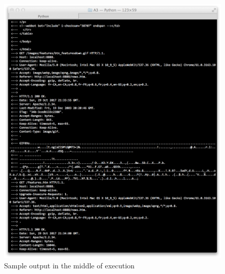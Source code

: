 \documentclass[11pt]{article}
\begin{document}
	\begin{figure}[H]
	\includegraphics[scale=0.5, trim={0cm 0cm 0cm 0cm}, clip]{strip_output_mid}
	\caption{Sample output in the middle of execution}
	\end{figure}
	
\end{document}
